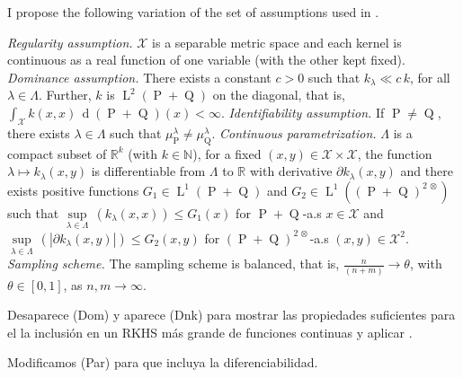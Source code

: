 	I propose the following variation of the set of assumptions used in \textcite{Carcamo2024}.
	\begin{description}
		 \textit{Regularity assumption.} $\mathcal{X}$ is a separable metric space and each kernel is continuous as a real function of one variable (with the other kept fixed).
		 \textit{Dominance assumption.} There exists a constant $c>0$ such that $k_{\lambda}\ll c\,k$, for all $\lambda\in\Lambda$. Further, $k$ is $\operatorname{L}^{2}(\operatorname{P}+\operatorname{Q})$ on the diagonal, that is, $\int_{\mathcal{X}}k(x,x)\,\operatorname{d}(\operatorname{P}+\operatorname{Q})(x)<\infty$.
		 \textit{Identifiability assumption.} If $\operatorname{P}\neq\operatorname{Q}$, there exists $\lambda\in\Lambda$ such that $\mu_{\operatorname{P}}^{\lambda}\neq\mu_{\operatorname{Q}}^{\lambda}$.
		 \textit{Continuous parametrization.} {\color{orange}$\Lambda$ is a compact subset of $\mathbb{R}^{k}$ (with $k\in\mathbb{N}$)}, for a fixed $(x,y)\in\mathcal{X}\times\mathcal{X}$, the function $\lambda\mapsto k_{\lambda}(x,y)$ is differentiable from $\Lambda$ to $\mathbb{R}$ with derivative $\partial k_{\lambda}(x,y)$ and there exists positive functions $G_{1}\in\operatorname{L}^{1}(\operatorname{P}+\operatorname{Q})$ and $G_{2}\in\operatorname{L}^{1}\left((\operatorname{P}+\operatorname{Q})^{2\,\otimes}\right)$ such that $\underset{\lambda\in\Lambda}{\operatorname{sup}}\,\left(k_{\lambda}(x,x)\right)\leq G_{1}(x)$ for $\operatorname{P}+\operatorname{Q}$-a.s $x\in\mathcal{X}$ and $\underset{\lambda\in\Lambda}{\operatorname{sup}}\,\left(\left|\partial k_{\lambda}(x,y)\right|\right)\leq G_{2}(x,y)$ for $(\operatorname{P}+\operatorname{Q})^{2\,\otimes}$-a.s $(x,y)\in\mathcal{X}^{2}$.
		 \textit{Sampling scheme.} The sampling scheme is balanced, that is, $\frac{n}{(n+m)}\to\theta$, with $\theta\in[0,1]$, as $n,m\to\infty$.
	\end{description}
	{\color{orange}Desaparece (Dom) y aparece (Dnk) para mostrar las propiedades suficientes para el la inclusi\'{o}n en un RKHS m\'{a}s grande de funciones continuas y aplicar \textcite{Marcus1985}.
	
	Modificamos (Par) para que incluya la diferenciabilidad.}

